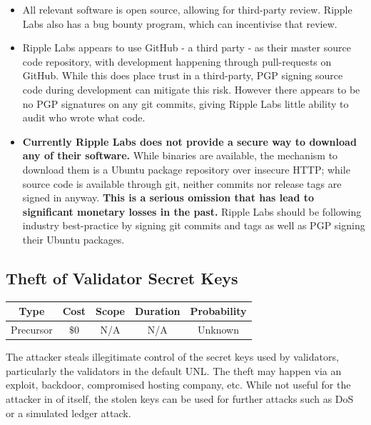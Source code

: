 \documentclass{article}
\begin{document}
\begin{itemize}

    \item All relevant software is open source, allowing for third-party
        review. Ripple Labs also has a bug bounty program, which can
        incentivise that review.

    \item Ripple Labs appears to use GitHub - a third party -
        as their master source code repository, with development happening
        through pull-requests on GitHub. While this does place trust in a
        third-party, PGP signing source code during development can mitigate
        this risk. However there appears to be no PGP signatures on any git
        commits, giving Ripple Labs little ability to audit who wrote what
        code.

    \item \textbf{Currently Ripple Labs does not provide a secure way to
        download any of their software.} While binaries are available, the
        mechanism to download them is a Ubuntu package repository over insecure
        HTTP; while source code is available through git, neither commits nor
        release tags are signed in anyway. \textbf{This is a serious omission
        that has lead to significant monetary losses in the past.} Ripple Labs
        should be following industry best-practice by signing git commits and
        tags\cite{wladimir-git-pgp} as well as PGP signing their Ubuntu
        packages.

\end{itemize}


\subsection{Theft of Validator Secret Keys}

\begin{center}
    \begin{tabular}{c|c|c|c|c}
        Type & Cost & Scope & Duration & Probability \\ \hline
        Precursor & $\$0$ & N/A & N/A & Unknown \\
    \end{tabular}
\end{center}

The attacker steals illegitimate control of the secret keys used by validators,
particularly the validators in the default UNL. The theft may happen via an
exploit, backdoor, compromised hosting company, etc. While not useful for the
attacker in of itself, the stolen keys can be used for further attacks such as
DoS or a simulated ledger attack.
\end{document}
